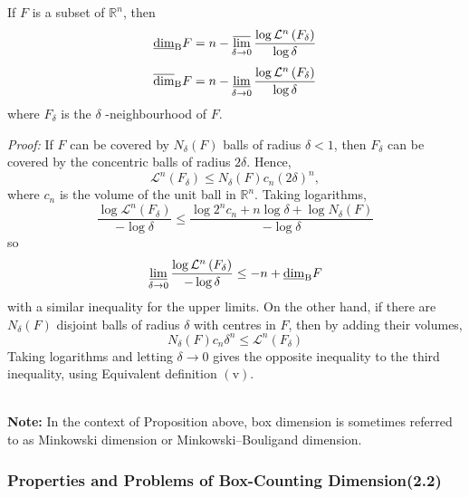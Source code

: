 \begin{proposition}
    If $F$ is a subset of $\mathbb{R}^{n}$, then
$$
\underline{\operatorname{dim}}_{\mathrm{B}} F=n-\varlimsup_{\delta \rightarrow 0} \frac{\log \mathcal{L}^{n}\left(F_{\delta}\right)}{\log \delta}
$$
$$
\overline{\operatorname{dim}}_{\mathrm{B}} F=n-\operatorname*{\underline{lim}}_{\delta \rightarrow 0} \frac{\log \mathcal{L}^{n}\left(F_{\delta}\right)}{\log \delta}
$$
where $F_{\delta}$ is the $\delta$ -neighbourhood of $F$. 
\end{proposition}
\textit{Proof: }
If $F$ can be covered by $N_{\delta}(F)$ balls of radius $\delta<1$, then $F_{\delta}$ can be covered by the concentric balls of radius $2 \delta .$ Hence,
$$
\mathcal{L}^{n}\left(F_{\delta}\right) \leq N_{\delta}(F) c_{n}(2 \delta)^{n},
$$
where $c_{n}$ is the volume of the unit ball in $\mathbb{R}^{n} .$ Taking logarithms,
$$
\frac{\log \mathcal{L}^{n}\left(F_{\delta}\right)}{-\log \delta} \leq \frac{\log 2^{n} c_{n}+n \log \delta+\log N_{\delta}(F)}{-\log \delta}
$$
so
$$
\varliminf_{\delta \rightarrow 0} \frac{\log \mathcal{L}^{n}\left(F_{\delta}\right)}{-\log \delta} \leq -n+\underline{\operatorname{dim}}_{\mathrm{B}} F
$$
with a similar inequality for the upper limits. On the other hand, if there are $N_{\delta}(F)$ disjoint balls of radius $\delta$ with centres in $F$, then by adding their volumes,
$$
N_{\delta}(F) c_{n} \delta^{n} \leq \mathcal{L}^{n}\left(F_{\delta}\right)
$$
Taking logarithms and letting $\delta \rightarrow 0$ gives the opposite inequality to the third inequality, using Equivalent definition $(\mathrm{v})$.


\textbf{\\Note: }In the context of Proposition above, box dimension is sometimes referred to as Minkowski dimension or Minkowski–Bouligand dimension.


\newpage
\subsubsection{Properties and Problems of Box-Counting Dimension(2.2)}



